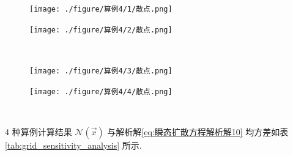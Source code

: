 \documentclass{Sichuan Normal University}
\begin{document}
\begin{figure}[H]
    \centering
    \begin{minipage}[c]{0.48\textwidth}
    \centering
    \texttt{[image: ./figure/算例4/1/散点.png]}
    \end{minipage}
    \hspace{0.02\textwidth}
    \begin{minipage}[c]{0.48\textwidth}
    \centering
    \texttt{[image: ./figure/算例4/2/散点.png]}
    \end{minipage}\\[3mm]
    \begin{minipage}[t]{0.48\textwidth}
    \centering
    \label{fig:算例1网格点分布图}
    \end{minipage}
    \hspace{0.02\textwidth}
    \begin{minipage}[t]{0.48\textwidth}
    \centering
    \label{fig:算例2网格点分布图}
    \end{minipage}
    \centering
    \begin{minipage}[c]{0.48\textwidth}
    \centering
    \texttt{[image: ./figure/算例4/3/散点.png]}
    \end{minipage}
    \hspace{0.02\textwidth}
    \begin{minipage}[c]{0.48\textwidth}
    \centering
    \texttt{[image: ./figure/算例4/4/散点.png]}
    \end{minipage}\\[3mm]
    \begin{minipage}[t]{0.48\textwidth}
    \centering
    \label{fig:算例3网格点分布图}
    \end{minipage}
    \hspace{0.02\textwidth}
    \begin{minipage}[t]{0.48\textwidth}
    \centering
    \label{fig:算例4网格点分布图}
    \end{minipage}
\end{figure}

4 种算例计算结果 $\mathcal{N}(\vec{x})$ 与解析解\eqref{eq:瞬态扩散方程解析解10} 均方差如表 \ref{tab:grid_sensitivity_analysis} 所示.
\end{document}
